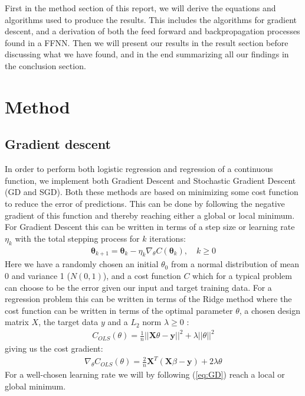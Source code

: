 \documentclass[11pt]{article}
\begin{document}
First in the method section of this report, we will derive the equations and algorithms used to produce the results. This includes the algorithms for gradient descent, and a derivation of both the feed forward and backpropagation processes found in a FFNN. Then we will present our results in the result section before discussing what we have found, and in the end summarizing all our findings in the conclusion section.
\section{Method}
\subsection{Gradient descent}\label{sec:GD}
In order to perform both logistic regression and regression of a continuous function, we implement both Gradient Descent and Stochastic Gradient Descent (GD and SGD). Both these methods are based on minimizing some cost function to reduce the error of predictions. This can be done by following the negative gradient of this function and thereby reaching either a global or local minimum. For Gradient Descent this can be written in terms of a step size or learning rate $\eta_k$ with the total stepping process for $k$ iterations:
\begin{align}
  \label{eq:GD}
  \boldsymbol{\theta}_{k+1} = \boldsymbol{\theta}_k - \eta_k \nabla_\theta C(\boldsymbol{\theta}_k),\quad k \geq 0
\end{align}
Here we have a randomly chosen an initial $\theta_0$ from a normal distribution of mean 0 and variance 1 ($N(0,1)$), and a cost function $C$ which for a typical problem can choose to be the error given our input and target training data. For a regression problem this can be written in terms of the Ridge method where the cost function can be written in terms of the optimal parameter $\theta$, a chosen design matrix $X$, the target data $y$ and a $L_2$ norm $\lambda \geq 0$ :
\begin{align*}
  C_{OLS}(\theta) = \frac{1 }{n }||\boldsymbol{X}\theta - \boldsymbol{y}||^2 + \lambda ||\theta||^2
\end{align*}
giving us the cost gradient:
\begin{align*}
  \nabla_\theta C_{OLS}(\theta) = \frac{2}{n}\boldsymbol{X}^T(\boldsymbol{X}\beta - \boldsymbol{y}) + 2\lambda \theta
\end{align*}
For a well-chosen learning rate we will by following (\ref{eq:GD}) reach a local or global minimum.
\end{document}
